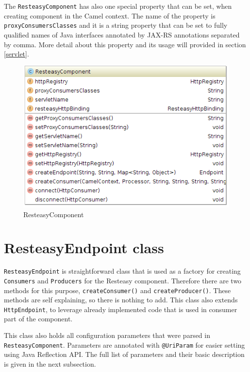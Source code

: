 \documentclass[12pt,final,oneside]{fithesis2}
\begin{document}
The \texttt{ResteasyComponent} has also one special property that can be set, when creating component in the Camel context. The name of  the property is \texttt{proxyConsumersClasses} and it is a string property that can be set to fully qualified names of Java interfaces annotated by JAX-RS annotations separated by comma. More detail about this property and its usage will provided in section \ref{servlet}.

\begin{figure}
\centering
\includegraphics[width=0.8\linewidth]{images/component.png}
\caption{ResteasyComponent}
\label{comp}
\end{figure}

\section{ResteasyEndpoint class}
\texttt{ResteasyEndpoint}  is straightforward class that is used as a factory for creating \texttt{Consumers} and \texttt{Producers} for the Resteasy component. Therefore there are two methods for this purpose, \texttt{createConsumer()} and \texttt{createProducer()}. These methods are self explaining, so there is nothing to add. This class also extends \texttt{HttpEndpoint}, to leverage already implemented code that is used in consumer part of the component.

This class also holds all configuration parameters that were parsed in \texttt{ResteasyComponent}. Parameters are annotated with \texttt{@UriParam} for easier setting using Java Reflection API. The full list of parameters and their basic description is given in the next subsection.
\end{document}

